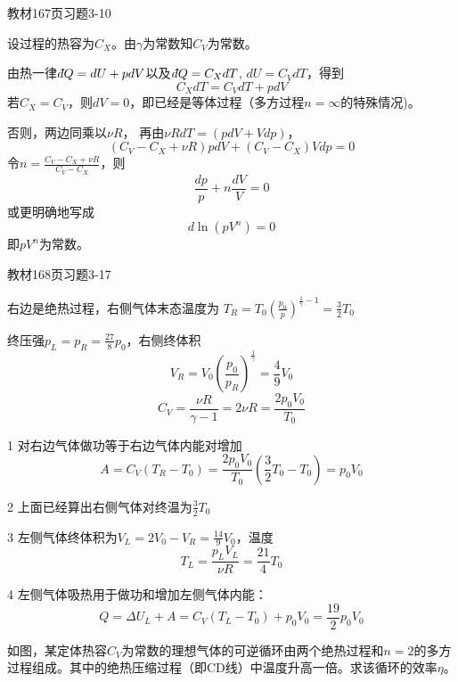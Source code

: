 \documentclass[CJK]{beamer}
\begin{document}
\begin{frame}
  \bch
  教材167页习题3-10
  \ech
\end{frame}


\begin{frame}
  \bch
  {\small
  设过程的热容为$C_X$。由$\gamma$为常数知$C_V$为常数。

  由热一律$\dbar Q = dU + pdV$以及$\dbar Q = C_X dT$, $dU = C_V dT$，得到
  $$ C_X dT = C_V dT + p dV$$
  若$C_X = C_V$，则$dV = 0$，即已经是等体过程（多方过程$n=\infty$的特殊情况)。
    
    否则，两边同乘以$\nu R$， 再由$\nu R dT =  (pdV + Vdp) $，
  $$ (C_V-C_X + \nu R) pdV + (C_V-C_X) Vdp = 0$$
  令$n =\frac{C_V-C_X + \nu R}{C_V-C_X }$，则
  $$ \frac{dp}{p} + n\frac{dV}{V} = 0$$
  或更明确地写成
  $$ d \ln (pV^n) = 0$$
  即$pV^n$为常数。
  }
  \ech
\end{frame}

\begin{frame}
  \bch
  教材168页习题3-17
  \ech
\end{frame}

\begin{frame}
  \bch
  {\scriptsize
    右边是绝热过程，右侧气体末态温度为
    $T_R = T_0\left(\frac{p_0}{p}\right)^{\frac{1}{\gamma}-1} = \frac{3}{2}T_0$
    
    终压强$p_L=p_R=\frac{27}{8}p_0$，右侧终体积
    $$V_R = V_0\left(\frac{p_0}{p_R}\right)^{\frac{1}{\gamma}} = \frac{4}{9}V_0$$
    $$C_V = \frac{\nu R}{\gamma - 1} = 2 \nu R = \frac{2p_0V_0}{T_0}$$
  
    \bitem
  \item[1]{对右边气体做功等于右边气体内能对增加
    $$A = C_V(T_R-T_0) = \frac{2p_0V_0}{T_0}\left(\frac{3}{2}T_0-T_0\right) = p_0V_0$$}
  \item[2]{上面已经算出右侧气体对终温为$\frac{3}{2}T_0$}
  \item[3]{左侧气体终体积为$V_L=2V_0-V_R = \frac{14}{9}V_0$，温度
    $$T_L = \frac{p_LV_L}{\nu R} = \frac{21}{4}T_0$$}
  \item[4]{左侧气体吸热用于做功和增加左侧气体内能：
    $$ Q = \Delta U_L + A = C_V(T_L-T_0) + p_0V_0 = \frac{19}{2}p_0V_0$$}
    \eitem
  }
  \ech
\end{frame}

\begin{frame}
  \bch

  如图，某定体热容$C_V$为常数的理想气体的可逆循环由两个绝热过程和$n=2$的多方过程组成。其中的绝热压缩过程（即CD线）中温度升高一倍。求该循环的效率$\eta$。
  \ech
\end{frame}
\end{document}
